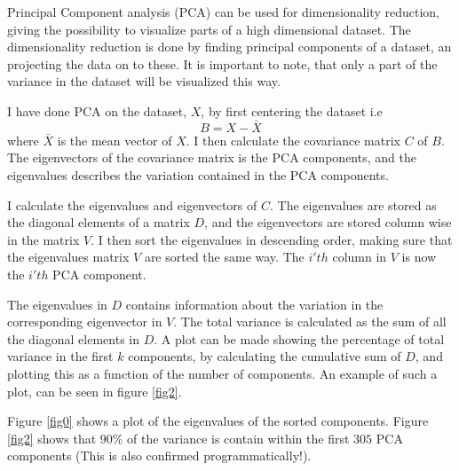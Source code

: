 \documentclass[10pt]{article}
\begin{document}
Principal Component analysis (PCA) can be used for dimensionality reduction, giving the possibility to visualize parts of a high dimensional dataset. The dimensionality reduction is done by finding principal components of a dataset, an projecting the data on to these. It is important to note, that only a part of the variance in the dataset will be visualized this way.

I have done PCA on the dataset, $X$, by first centering the dataset i.e
\begin{equation}
  B = X - \bar{X}
\end{equation} 
where $\bar{X}$ is the mean vector of $X$. I then calculate the covariance matrix $C$ of $B$. The eigenvectors of the covariance matrix is the PCA components, and the eigenvalues describes the variation contained in the PCA components. 

I calculate the eigenvalues and eigenvectors of $C$. The eigenvalues are stored as the diagonal elements of a matrix $D$, and the eigenvectors are stored column wise in the matrix $V$. I then sort the eigenvalues in descending order, making sure that the eigenvalues matrix $V$ are sorted the same way. The $i'th$ column in $V$ is now the $i'th$ PCA component. 

The eigenvalues in $D$ contains information about the variation in the corresponding eigenvector in $V$. The total variance is calculated as the sum of all the diagonal elements in $D$. A plot can be made showing the percentage of total variance in the first $k$ components, by calculating the cumulative sum of $D$, and plotting this as a function of the number of components. An example of such a plot, can be seen in figure \ref{fig2}.
  
Figure \ref{fig0} shows a plot of the eigenvalues of the sorted components. Figure \ref{fig2} shows that $90\%$ of the variance is contain within the first $305$ PCA components (This is also confirmed programmatically!).
\end{document}
